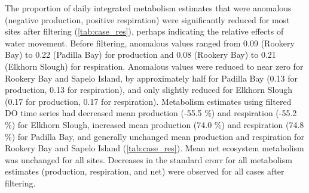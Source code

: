\documentclass[letterpaper,12pt,oneside]{article}\usepackage[]{graphicx}\usepackage[]{color}
\begin{document}
The proportion of daily integrated metabolism estimates that were anomalous (negative production, positive respiration) were significantly reduced for most sites after filtering (\cref{tab:case_res}), perhaps indicating the relative effects of water movement.  Before filtering, anomalous values ranged from 0.09 (Rookery Bay) to 0.22 (Padilla Bay) for production and 0.08 (Rookery Bay) to 0.21 (Elkhorn Slough) for respiration. Anomalous values were reduced to near zero for Rookery Bay and Sapelo Island, by approximately half for Padilla Bay (0.13 for production, 0.13 for respiration), and only slightly reduced for Elkhorn Slough (0.17 for production, 0.17 for respiration).  Metabolism estimates using filtered \ac{DO} time series had decreased mean production (-55.5 \%) and respiration (-55.2 \%) for Elkhorn Slough, increased mean production (74.0 \%) and respiration (74.8 \%) for Padilla Bay, and generally unchanged mean production and respiration for Rookery Bay and Sapelo Island (\cref{tab:case_res}).  Mean net ecosystem metabolism was unchanged for all sites.  Decreases in the standard erorr for all metabolism estimates (production, respiration, and net) were observed for all cases after filtering.  
\end{document}
